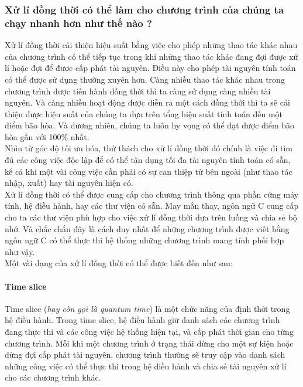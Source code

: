 \documentclass{article}
\begin{document}
\subsubsection{Xử lí đồng thời có thể làm cho chương trình của chúng ta chạy nhanh hơn như thế nào ?}
Xử lí đồng thời cải thiện hiệu suất bằng việc cho phép những thao tác khác nhau của chương trình có thể tiếp tục trong khi những thao tác khác đang đợi được xử lí hoặc đợi để được cấp phát tài nguyên. Điều này cho phép tài nguyên tính toán có thể được sử dụng thường xuyên hơn. Càng nhiều thao tác khác nhau trong chương trình được tiến hành đồng thời thì ta càng sử dụng càng nhiều tài nguyên. Và càng nhiều hoạt động được diễn ra một cách đồng thời thì ta sẽ cải thiện được hiệu suất của chúng ta dựa trên tổng hiệu suất tính toán đến một điểm bão hòa. Và đương nhiên, chúng ta luôn hy vọng có thể đạt được điểm bão hòa gần với 100$\%$ nhất.\\

Nhìn từ góc độ tối ưu hóa, thử thách cho xử lí đồng thời đó chính là việc đi tìm đủ các công việc độc lập để có thể tận dụng tối đa tài nguyên tính toán có sẵn, kể cả khi một vài công việc cần phải có sự can thiệp từ bên ngoài (như thao tác nhập, xuất) hay tài nguyên hiện có.\\

Xử lí đồng thời có thể được cung cấp cho chương trình thông qua phần cứng máy tính, hệ điều hành, hay các thư viện có sẵn. May mắn thay, ngôn ngữ C cung cấp cho ta các thư viện phù hợp cho việc xử lí đồng thời dựa trên luồng và chia sẻ bộ nhớ. Và chắc chắn đây là cách duy nhất để những chương trình được viết bằng ngôn ngữ C có thể thực thi hệ thống những chương trình mang tính phối hợp như vậy.\\

Một vài dạng của xử lí đồng thời có thể được biết đến như sau:
\paragraph{Time slice}
Time slice (\textit{hay còn gọi là quantum time}) là một chức năng của định thời trong hệ điều hành. Trong time slice, hệ điều hành giữ danh sách các chương trình đang thực thi và các công việc hệ thống hiện tại, và cấp phát thời gian cho từng chương trình. Mỗi khi một chương trình ở trạng thái dừng cho một sự kiện hoặc dừng đợi cấp phát tài nguyên, chương trình thường sẽ truy cập vào danh sách những công việc có thể thực thi trong hệ điều hành và chia sẻ tài nguyên xử lí cho các chương trình khác.\\
\end{document}

